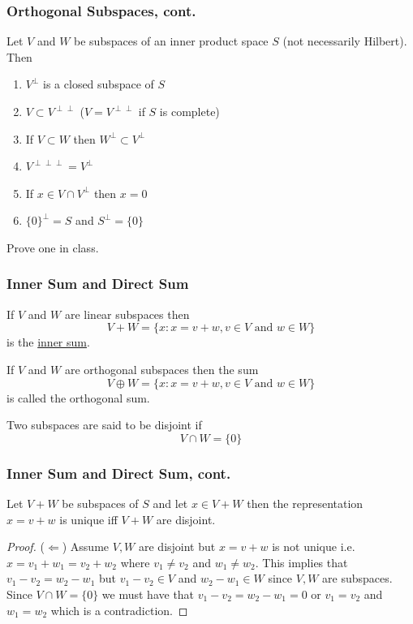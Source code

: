 \documentclass{beamer}
\begin{document}
\begin{frame}\frametitle{Orthogonal Subspaces, cont.}
	
\begin{theorem}
Let $V$ and $W$ be subspaces of an inner product space $S$ (not necessarily Hilbert).  Then
\begin{enumerate}
  \item $V^{\perp}$ is a closed subspace of $S$
  \item $V \subset V^{\perp \perp}$  ($V = V^{\perp\perp}$ if $S$ is complete)
  \item If $V \subset W$ then $W^{\perp} \subset V^{\perp}$
  \item $V^{\perp\perp\perp} = V^{\perp}$
  \item If $x \in V \cap V^{\perp}$ then $x = 0$
  \item $\{0\}^{\perp} = S$ and $S^{\perp} = \{0\}$
\end{enumerate}
\end{theorem}
Prove one in class.
\end{frame}


\begin{frame}\frametitle{Inner Sum and Direct Sum}
\begin{definition} 
If $V$ and $W$ are linear subspaces then
\[ V + W = \{ x: x=v+w, v \in V \text{ and } w \in W\} \]
is the \underline{inner sum}.	
\end{definition}
\begin{definition}
 If $V$ and $W$ are orthogonal subspaces then the sum
\[ V \oplus W = \{ x: x = v + w, v \in V \text{ and } w \in W\} \]
is called the orthogonal sum.	
\end{definition}
\begin{definition}
Two subspaces are said to be disjoint if
\[ V \cap W = \{ 0 \} \]	
\end{definition}

\end{frame}

\begin{frame}\frametitle{Inner Sum and Direct Sum, cont.}
\begin{lemma}
  Let $V + W$ be subspaces of $S$ and let $x \in V + W$ then the
  representation $x = v + w$ is unique iff $V + W$ are disjoint.
\end{lemma}
\begin{proof}
	($\Leftarrow$) Assume $V,W$ are disjoint but $x = v+w$
is not unique i.e. $x = v_1+w_1 = v_2+w_2$ where $v_1 \neq v_2$ and
$w_1 \neq w_2$.  This implies that $v_1 - v_2 = w_2 - w_1$ but $v_1 -
v_2 \in V$ and $w_2 - w_1 \in W$ since $V,W$ are subspaces.  Since $V
\cap W = \{ 0 \}$ we must have that $v_1 - v_2 = w_2 - w_1 = 0$ or
$v_1 = v_2$ and $w_1 = w_2$ which is a contradiction.
\end{proof}

\end{frame}
\end{document}
